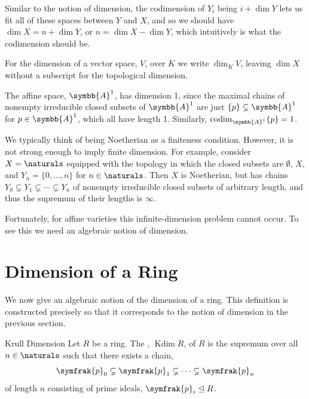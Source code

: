 \documentclass[fleqn]{NotesClass}
\newcommand{\subideal}{\trianglelefteq}
\newcommand{\affine}{\symbb{A}}
\newcommand{\ideal}[1]{\symfrak{#1}}
\DeclareMathOperator{\codim}{codim}
\DeclareMathOperator{\Kdim}{Kdim}
\begin{document}
    Similar to the notion of dimension, the codimension of \(Y_i\) being \(i + \dim Y\) lets us fit all of these spaces between \(Y\) and \(X\), and so we should have \(\dim X = n + \dim Y\), or \(n = \dim X - \dim Y\), which intuitively is what the codimension should be.
    
    \begin{ntn}{}{}
        For the dimension of a vector space, \(V\), over \(K\) we write \(\dim_K V\), leaving \(\dim X\) without a subscript for the topological dimension.
    \end{ntn}
    
    \begin{exm}{}{}
        The affine space, \(\affine^1\), has dimension 1, since the maximal chains of nonempty irreducible closed subsets of \(\affine^1\) are just \(\{p\} \subsetneq \affine^1\) for \(p \in \affine^1\), which all have length 1.
        Similarly, \(\codim_{\affine^1} \{p\} = 1\).
    \end{exm}
    
    \begin{remark}{}{}
        We typically think of being Noetherian as a finiteness condition.
        However, it is not strong enough to imply finite dimension.
        For example, consider \(X = \naturals\) equipped with the topology in which the closed subsets are \(\emptyset\), \(X\), and \(Y_n = \{0, \dotsc, n\}\) for \(n \in \naturals\).
        Then \(X\) is Noetherian, but has chains \(Y_0 \subsetneq Y_1 \subsetneq \dotsb \subsetneq Y_n\) of nonempty irreducible closed subsets of arbitrary length, and thus the supremum of their lengths is \(\infty\).
    \end{remark}
    
    Fortunately, for affine varieties this infinite-dimension problem cannot occur.
    To see this we need an algebraic notion of dimension.
    
    \section{Dimension of a Ring}
    We now give an algebraic notion of the dimension of a ring.
    This definition is constructed precisely so that it corresponds to the notion of dimension in the previous section.
    
    \begin{dfn}{Krull Dimension}{}
        Let \(R\) be a ring.
        The , \(\Kdim R\), of \(R\) is the supremum over all \(n \in \naturals\) such that there exists a chain,
        \begin{equation}
            \ideal{p}_0 \subsetneq \ideal{p}_1 \subsetneq \dotsb \subsetneq \ideal{p}_n
        \end{equation}
        of length \(n\) consisting of prime ideals, \(\ideal{p}_i \subideal R\).
    \end{dfn}
    
\end{document}
